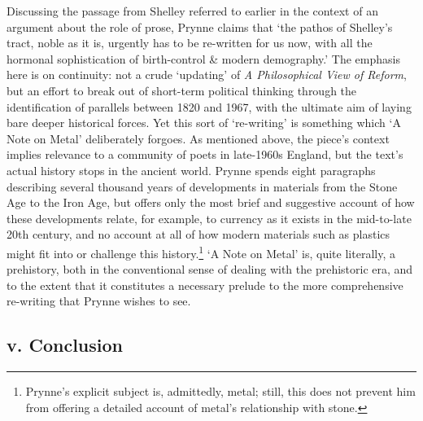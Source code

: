 \documentclass[]{article}
\begin{document}
Discussing the passage from Shelley referred to earlier in the context
of an argument about the role of prose, Prynne claims that `the pathos
of Shelley's tract, noble as it is, urgently has to be re-written for us
now, with all the hormonal sophistication of birth-control \& modern
demography.' The emphasis here is on continuity: not a crude `updating'
of \emph{A Philosophical View of Reform}, but an effort to break out of
short-term political thinking through the identification of parallels
between 1820 and 1967, with the ultimate aim of laying bare deeper
historical forces. Yet this sort of `re-writing' is something which `A
Note on Metal' deliberately forgoes. As mentioned above, the piece's
context implies relevance to a community of poets in late-1960s England,
but the text's actual history stops in the ancient world. Prynne spends
eight paragraphs describing several thousand years of developments in
materials from the Stone Age to the Iron Age, but offers only the most
brief and suggestive account of how these developments relate, for
example, to currency as it exists in the mid-to-late 20th century, and
no account at all of how modern materials such as plastics might fit
into or challenge this history.\footnote{Prynne's explicit subject is,
  admittedly, metal; still, this does not prevent him from offering a
  detailed account of metal's relationship with stone.} `A Note on
Metal' is, quite literally, a prehistory, both in the conventional sense
of dealing with the prehistoric era, and to the extent that it
constitutes a necessary prelude to the more comprehensive re-writing
that Prynne wishes to see.

\subsection{v. Conclusion}\label{v.-conclusion-1}
\end{document}
